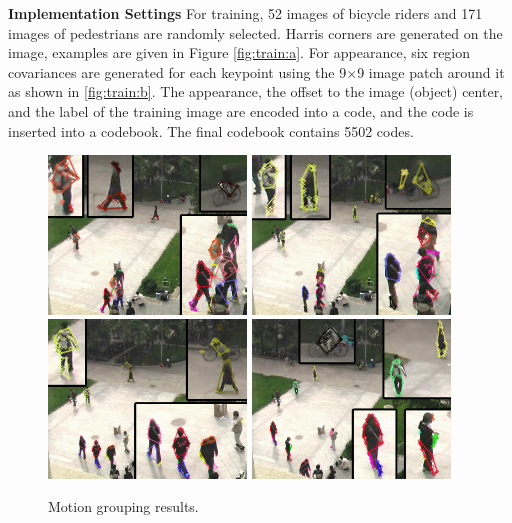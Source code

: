 \textbf{Implementation Settings} For training, 52 images of bicycle riders and 171 images of pedestrians are randomly selected. Harris corners are generated on the image, examples are given in Figure \ref{fig:train:a}. For appearance, six region covariances are generated for each keypoint using the 9$\times$9 image patch around it as shown in \ref{fig:train:b}. The appearance, the offset to the image (object) center, and the label of the training image are encoded into a code, and the code is inserted into a codebook. The final codebook contains 5502 codes.

\begin{figure}
\centering
\includegraphics[width=0.47\textwidth,bb=0 0 720 576]{a16.jpg}
\includegraphics[width=0.47\textwidth,bb=0 0 720 576]{a26.jpg}\\
\includegraphics[width=0.47\textwidth,bb=0 0 720 576]{a71.jpg}
\includegraphics[width=0.47\textwidth,bb=0 0 720 576]{a116.jpg}
\caption[Motion grouping results]{Motion grouping results.}
\label{fig:mgr}
\end{figure}



